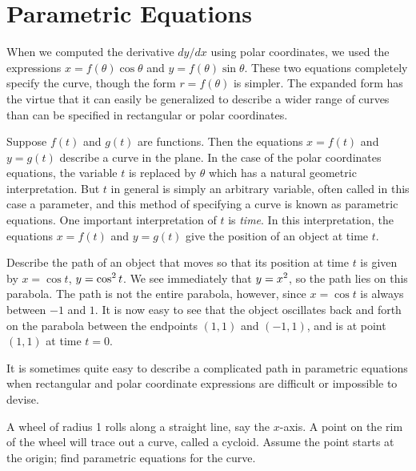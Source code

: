 \section{Parametric Equations}{}{}
\nobreak
When we computed the derivative $dy/dx$ using polar coordinates, we
used the expressions $x=f(\theta)\cos\theta$ and
$y=f(\theta)\sin\theta$. These two equations completely specify the
curve, though the form $r=f(\theta)$ is simpler. The expanded form has
the virtue that it can easily be generalized to describe a wider range
of curves than can be specified in rectangular or polar coordinates. 

Suppose $f(t)$ and $g(t)$ are functions. Then the equations
$x=f(t)$ and $y=g(t)$ describe a curve in the plane. In the case of
the polar coordinates equations, the variable $t$ is replaced by
$\theta$ which has a natural geometric interpretation. But $t$ in
general is simply an arbitrary variable, often called in this case a
{\dfont parameter}, and this method of specifying a curve is known as 
{\dfont parametric equations}. One
important interpretation of $t$ is {\it time}. In this interpretation,
the equations $x=f(t)$ and $y=g(t)$ give the position of an object at
time $t$.

\example Describe the path of an object that moves so that its
position at time $t$ is given by $x=\cos t$, $\displaystyle y=\cos^2 t$. We see
immediately that $\displaystyle y=x^2$, so the path lies on this parabola. The path
is not the entire parabola, however, since $x=\cos t$ is always
between $-1$ and $1$. It is now easy to see that the object oscillates
back and forth on the parabola between the endpoints $(1,1)$ and
$(-1,1)$, and is at point $(1,1)$ at time $t=0$.
\endexample

It is sometimes quite easy to describe a complicated path in
parametric equations when rectangular and polar coordinate expressions
are difficult or impossible to devise.

\example A wheel of radius 1 rolls along a straight line, say the
$x$-axis. A point on the rim of the wheel will trace out a curve, called a
cycloid. Assume the point starts at the origin; find
parametric equations for the curve.

